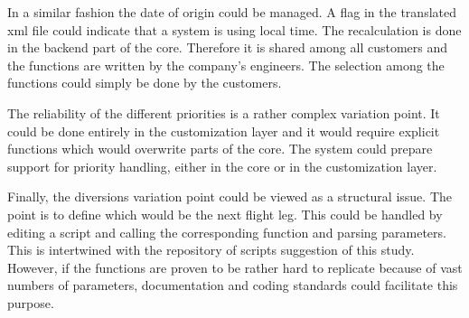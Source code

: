 In a similar fashion the date of origin could be managed. A flag in the translated xml file could indicate that a system is using local time. The recalculation is done in the backend part of the core. Therefore it is shared among all customers and the functions are written by the company's engineers. The selection among the functions could simply be done by the customers. 

The reliability of the different priorities is a rather complex variation point. It could be done entirely in the customization layer and it would require explicit functions which would overwrite parts of the core. The system could prepare support for priority handling, either in the core or in the customization layer.

Finally, the diversions variation point could be viewed as a structural issue. The point is to define which would be the next flight leg. This could be handled by editing a script and calling the corresponding function and parsing parameters. This is intertwined with the repository of scripts suggestion of this study. However, if the functions are proven to be rather hard to replicate because of vast numbers of parameters, documentation and coding standards could facilitate this purpose.